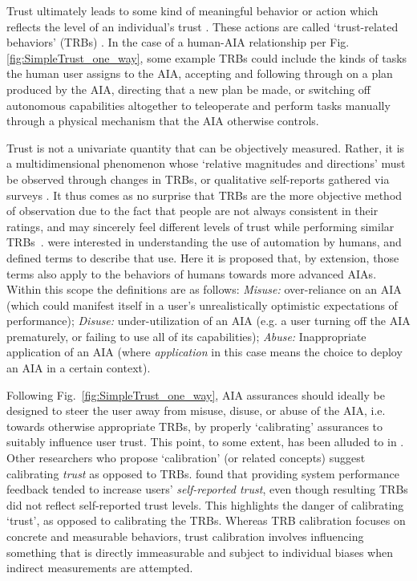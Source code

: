 Trust ultimately leads to some kind of meaningful behavior or action which reflects the level of an individual's trust \cite{Lewis1985-pr}. 
These actions are called `trust-related behaviors' (TRBs) \cite{McKnight2001-fa}. 
In the case of a human-AIA relationship per Fig. \ref{fig:SimpleTrust_one_way}, 
some example TRBs could include the kinds of tasks the human user assigns to the AIA, accepting and following through on a plan produced by the AIA, directing that a new plan be made, or switching off autonomous capabilities altogether to teleoperate and perform tasks manually through a physical mechanism that the AIA otherwise controls.  

Trust is not a univariate quantity that can be objectively measured. Rather, it is a multidimensional phenomenon whose `relative magnitudes and directions' must be observed through changes in TRBs, or qualitative self-reports gathered via surveys \cite{Muir1996-gt}. It thus comes as no surprise that TRBs are the more objective method of observation due to the fact that people are not always consistent in their ratings, and may sincerely feel different levels of trust while performing similar TRBs~\cite{Dzindolet2003-ts}. \citet{Parasuraman1997-co} were interested in understanding the use of automation by humans, and defined terms to describe that use. Here it is proposed that, by extension, those terms also apply to the behaviors of humans towards more advanced AIAs. Within this scope the definitions are as follows: \textit{Misuse:} over-reliance on an AIA (which could manifest itself in a user's unrealistically optimistic expectations of performance); \textit{Disuse:} under-utilization of an AIA (e.g. a user turning off the AIA prematurely, or failing to use all of its capabilities); \textit{Abuse:} Inappropriate application of an AIA (where \emph{application} in this case means the choice to deploy an AIA in a certain context).

Following Fig.~\ref{fig:SimpleTrust_one_way}, AIA assurances should ideally be designed to steer the user away from misuse, disuse, or abuse of the AIA, i.e. towards otherwise appropriate TRBs, by properly `calibrating' assurances to suitably influence user trust. This point, to some extent, has been alluded to in \cite{Muir1994-ow,Lillard2015-yg,Lee2004-pv,Hutchins2015-if}. Other researchers who propose `calibration' (or related concepts) suggest calibrating \emph{trust} as opposed to TRBs. \citet{Dzindolet2003-ts} found that providing system performance feedback tended to increase users' \textit{self-reported trust}, even though resulting TRBs did not reflect self-reported trust levels. This highlights the danger of calibrating `trust', as opposed to calibrating the TRBs. Whereas TRB calibration focuses on concrete and measurable behaviors, trust calibration involves influencing something that is directly immeasurable and subject to individual biases when indirect measurements are attempted.
